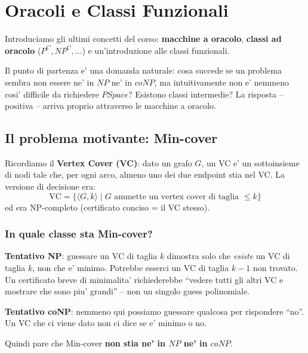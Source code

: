% 
\chapter{Oracoli e Classi Funzionali}

Introduciamo gli ultimi concetti del corso: \textbf{macchine a oracolo}, \textbf{classi ad oracolo} ($P^C, NP^C, \ldots$) e un'introduzione alle classi funzionali.

Il punto di partenza e' una domanda naturale: cosa succede se un problema sembra non essere ne' in $NP$ ne' in $coNP$, ma intuitivamente non e' nemmeno cosi' difficile da richiedere $PSpace$? Esistono classi intermedie? La risposta -- positiva -- arriva proprio attraverso le macchine a oracolo.

\section{Il problema motivante: Min-cover}

Ricordiamo il \textbf{Vertex Cover (VC)}: dato un grafo $G$, un VC e' un sottoinsieme di nodi tale che, per ogni arco, almeno uno dei due endpoint stia nel VC. La versione di decisione era:
\[
  \text{VC} = \{ \langle G, k\rangle \mid G \text{ ammette un vertex cover di taglia } \leq k \}
\]
ed era NP-completo (certificato conciso = il VC stesso).


\subsection{In quale classe sta Min-cover?}

\textbf{Tentativo NP}: guessare un VC di taglia $k$ dimostra solo che \textit{esiste} un VC di taglia $k$, non che e' minimo. Potrebbe esserci un VC di taglia $k-1$ non trovato. Un certificato breve di minimalita' richiederebbe ``vedere tutti gli altri VC e mostrare che sono piu' grandi'' -- non un singolo guess polinomiale.

\textbf{Tentativo coNP}: nemmeno qui possiamo guessare qualcosa per rispondere ``no''. Un VC che ci viene dato non ci dice se e' minimo o no.

Quindi pare che Min-cover \textbf{non stia ne' in $NP$ ne' in $coNP$}.

